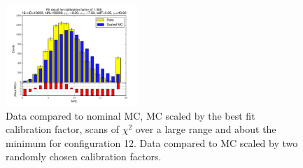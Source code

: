 \begin{figure}[htbp]
\begin{center}
\includegraphics[width=0.45\textwidth]{../FIGURES/12/FIG_Fit_result_for_calibration_factor_of_1_360.pdf} 
\caption{Data compared to nominal MC, MC scaled by the best fit calibration factor, scans of $\chi^2$ over a large range and about the minimum for configuration 12. Data compared to MC scaled by two randomly chosen calibration factors.} 
\label{tab:best_12} 
\end{center} \end{figure} 

